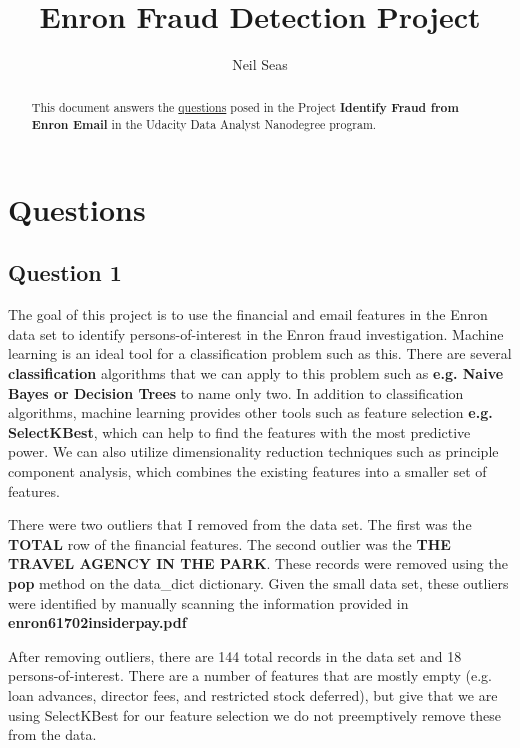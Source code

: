 \documentclass[a4paper,11pt]{report}
\title{Enron Fraud Detection Project}
\author{Neil Seas}
\begin{document}
\maketitle
\tableofcontents

\begin{abstract}
This document answers the
    \href{https://docs.google.com/document/d/1NDgi1PrNJP7WTbfSUuRUnz8yzs5nGVTSzpO7oeNTEWA/pub?embedded=true}{questions}
    posed in the Project \textbf{Identify Fraud from Enron Email} in the Udacity Data Analyst Nanodegree program.
\end{abstract}

\chapter{Questions}
\section{Question 1}

The goal of this project is to use the financial and email features in the Enron
data set to identify persons-of-interest in the Enron fraud investigation.
Machine learning is an ideal tool for a classification problem such as
this.  There are several \textbf{classification} algorithms that we can apply to
this problem such as \textbf{e.g. Naive Bayes or Decision Trees} to name only two.
In addition to classification algorithms, machine learning provides other tools
such as feature selection \textbf{e.g. SelectKBest}, which can help to find the features
with the most predictive power.  We can also utilize dimensionality reduction
techniques such as principle component analysis, which combines the existing
features into a smaller set of features.

There were two outliers that I removed from the data set.  The first was the
\textbf{TOTAL} row of the financial features.  The second outlier was the
\textbf{THE TRAVEL AGENCY IN THE PARK}.  These records were removed using the
\textbf{pop} method on the data\_dict dictionary.  Given the small data set, these
outliers were identified by manually scanning the information provided in
\textbf{enron61702insiderpay.pdf}

After removing outliers, there are 144 total records in the data set and 18
persons-of-interest.  There are a number of features that are mostly empty (e.g.
loan advances, director fees, and restricted stock deferred), but give that we
are using SelectKBest for our feature selection we do not preemptively remove
these from the data.
\end{document}
